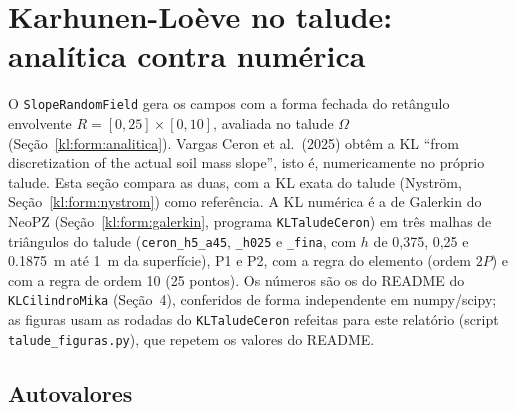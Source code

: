 \section{Karhunen-Loève no talude: analítica contra numérica}\label{sec:kl:tal}

O \texttt{SlopeRandomField} gera os campos com a forma fechada do retângulo envolvente $R = [0, 25] \times [0, 10]$,
avaliada no talude $\Omega$ (Seção~\ref{kl:form:analitica}). Vargas Ceron et al.\ (2025) obtêm a KL ``from
discretization of the actual soil mass slope'', isto é, numericamente no próprio talude. Esta seção compara as duas, com
a KL exata do talude (Nyström, Seção~\ref{kl:form:nystrom}) como referência. A KL numérica é a de Galerkin do NeoPZ
(Seção~\ref{kl:form:galerkin}, programa \texttt{KLTaludeCeron}) em três malhas de triângulos do talude
(\texttt{ceron\_h5\_a45}, \texttt{\_h025} e \texttt{\_fina}, com $h$ de 0,375, 0,25 e \SI{0.1875}{m} até \SI{1}{m} da
superfície), P1 e P2, com a regra do elemento (ordem $2P$) e com a regra de ordem 10 (25 pontos). Os números são os do
README do \texttt{KLCilindroMika} (Seção~4), conferidos de forma independente em numpy/scipy; as figuras usam as
rodadas do \texttt{KLTaludeCeron} refeitas para este relatório (script \texttt{talude\_figuras.py}), que repetem os
valores do README.

\subsection{Autovalores}

